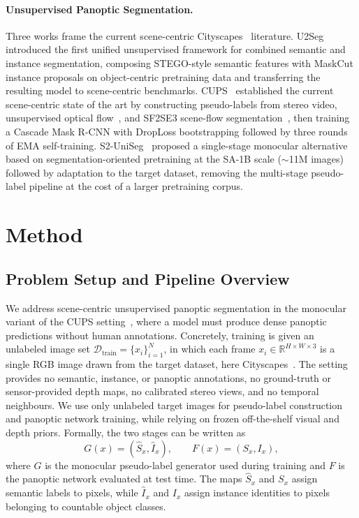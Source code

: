 \documentclass{article}
\begin{document}
\paragraph{Unsupervised Panoptic Segmentation.}
Three works frame the current scene-centric Cityscapes~\cite{cordts2016cityscapes} literature. U2Seg~\cite{niu2024u2seg} introduced the first unified unsupervised framework for combined semantic and instance segmentation, composing STEGO-style semantic features with MaskCut instance proposals on object-centric pretraining data and transferring the resulting model to scene-centric benchmarks. CUPS~\cite{hahn2025cups} established the current scene-centric state of the art by constructing pseudo-labels from stereo video, unsupervised optical flow~\cite{stone2021smurf}, and SF2SE3 scene-flow segmentation~\cite{sommer2022sf2se3}, then training a Cascade Mask R-CNN with DropLoss bootstrapping followed by three rounds of EMA self-training. S2-UniSeg~\cite{xu2025s2uniseg} proposed a single-stage monocular alternative based on segmentation-oriented pretraining at the SA-1B scale ($\sim$11M images) followed by adaptation to the target dataset, removing the multi-stage pseudo-label pipeline at the cost of a larger pretraining corpus.


\section{Method}
\label{sec:method}

\subsection{Problem Setup and Pipeline Overview}
\label{sec:method:setup}

We address scene-centric unsupervised panoptic segmentation in the monocular variant of the CUPS setting~\cite{hahn2025cups}, where a model must produce dense panoptic predictions without human annotations. Concretely, training is given an unlabeled image set $\mathcal{D}_{\text{train}} = \{x_i\}_{i=1}^{N}$, in which each frame $x_i \in \mathbb{R}^{H \times W \times 3}$ is a single RGB image drawn from the target dataset, here Cityscapes~\cite{cordts2016cityscapes}. The setting provides no semantic, instance, or panoptic annotations, no ground-truth or sensor-provided depth maps, no calibrated stereo views, and no temporal neighbours. We use only unlabeled target images for pseudo-label construction and panoptic network training, while relying on frozen off-the-shelf visual and depth priors. Formally, the two stages can be written as
\begin{equation}
G(x) = (\hat S_x, \hat I_x), \qquad F(x) = (S_x, I_x),
\label{eq:pipeline}
\end{equation}
where $G$ is the monocular pseudo-label generator used during training and $F$ is the panoptic network evaluated at test time. The maps $\hat S_x$ and $S_x$ assign semantic labels to pixels, while $\hat I_x$ and $I_x$ assign instance identities to pixels belonging to countable object classes.
\end{document}
